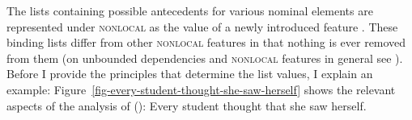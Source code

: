 \documentclass[output=paper,biblatex,babelshorthands,newtxmath,draftmode,colorlinks,citecolor=brown]{langscibook}
\begin{document}
\noindent
The lists containing possible antecedents for various nominal elements are represented under
\textsc{nonlocal} as the value of a newly introduced feature . These binding lists differ from
other \textsc{nonlocal} features in that nothing is ever removed from them (on unbounded dependencies
and \textsc{nonlocal} features in general see ). Before I provide the principles that
determine the list values, I explain an example:
Figure~\ref{fig-every-student-thought-she-saw-herself} shows the relevant aspects of the analysis of ():
\ea
Every student thought that she saw herself.
\z
\begin{sidewaysfigure}
\centering
\resizebox{.8\textwidth}{!}{%
\begin{forest}
[\avm{
   [ list-a  & < > \\
     list-z  & < > \\
     list-u  & < \1, \2, \3, \4, \5 >\\
     list-lu & < \1, \2, \3, \4, \5 > ] }
   [\avm{
     [ \ldots cont|conds & < \ldots, [ arg-r & \1 ], \ldots > \\
       \ldots |binding   & [ list-a  & < > \\
                             list-z  & < > \\
                             list-u  & < \1, \2, \3, \4, \5 >\\
                             list-lu & < \1 > ] ]}
     [ctx]]
   [\avm{
     [ list-a  & < \2, \3 > \\
       list-z  & < \2, \3 > \\
       list-u  & < \1, \2, \3, \4, \5 >\\
       list-lu & < \2, \3, \4, \5 > ]} 
     [\avm{
       [ \ldots anaphora & [ r-mark & \3 \\
                             var    & \2 \\ ]\\
         \ldots |binding   & [ list-a  & < \2, \3 > \\
                               list-z  & < \2, \3 > \\
                               list-u  & < \1, \2, \3, \4, \5 >\\
                               list-lu & < \2, \3 > ] ]} 
       [every student, roof]]
      [\avm{
          [ list-a  & < \2, \3 > \\
            list-z  & < \2, \3 > \\
            list-u  & < \1, \2, \3, \4, \5 >\\
}
\end{forest}}
\end{sidewaysfigure}
\end{document}
